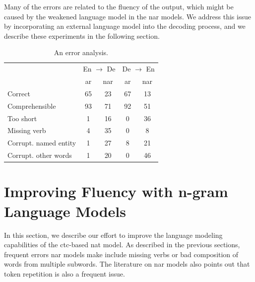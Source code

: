 Many of the errors are related to the fluency of the output, which might be
caused by the weakened language model in the \ac{nar} models. We address this
issue by incorporating an external language model into the decoding process,
and we describe these experiments in the following section.

\begin{table}
  \centering
  \begin{tabular}{lcccc}
    \toprule
    & \multicolumn{2}{c}{En $\rightarrow$ De} & \multicolumn{2}{c}{De $\rightarrow$ En} \\
    & \acs{ar} & \acs{nar} & \acs{ar} & \acs{nar} \\
    \midrule
    Correct        & 65 & 23 & 67 & 13 \\
    Comprehensible & 93 & 71 & 92 & 51 \\
    \midrule
    Too short      & 1 & 16 & 0 & 36 \\
    Missing verb   & 4 & 35 & 0 & 8 \\
    Corrupt. named entity   & 1 & 27 & 8 & 21 \\
    Corrupt. other words & 1 & 20 & 0 & 46 \\
    \bottomrule
  \end{tabular}

  \caption{An error analysis. }%
  \label{tab:end-to-end:error-analysis}

\end{table}



\section{Improving Fluency with n-gram Language Models}%
\label{sec:ctc:fluency}


\noindent
In this section, we describe our effort to improve the language modeling
capabilities of the \acs{ctc}-based \ac{nat} model. As described in the
previous sections, frequent errors \acl{nar} models make include missing verbs
or bad composition of words from multiple subwords. The literature on \ac{nar}
models also points out that token repetition is also a frequent issue. 

